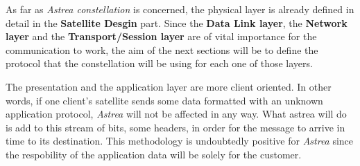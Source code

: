 As far as \textit{Astrea constellation} is concerned, the physical layer is already defined in detail in the \textbf{Satellite Desgin} part. Since the\textbf{ Data Link layer}, the \textbf{Network layer} and the \textbf{Transport/Session layer} are of vital importance for the communication to work, the aim of the next sections will be to define the protocol that the constellation will be using for each one of those layers.

The presentation and the application layer are more client oriented. In other words, if one client's satellite sends some data formatted with an unknown application protocol, \textit{Astrea} will not be affected in any way. What astrea will do is add to this stream of bits, some headers, in order for the message to arrive in time to its destination. This methodology is undoubtedly positive for \textit{Astrea} since the respobility of the application data will be solely for the customer.